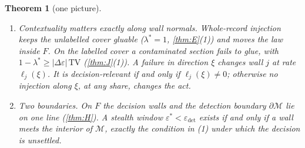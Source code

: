 \documentclass[11pt]{article}
\newtheorem{theorem}{Theorem}\renewcommand{\thetheorem}{\Alph{theorem}}
\theoremstyle{definition}\newtheorem{definition}{Definition}\newtheorem{remark}{Remark}
\begin{document}
\begin{theorem}[one picture]
\begin{enumerate}
\begin{itemize}
    $B\sigma_\ell/\sqrt N$, with $B=(c_s-q_\beta)\sqrt{\pi/(1-\pi)}$. Its capacity is measured in standard errors (\cref{thm:J}).
  \end{itemize}
\item[(4)] \emph{Contextuality matters exactly along wall normals.} Whole-record injection keeps the unlabelled cover gluable
  ($\lambda^*=1$, \cref{thm:E}(1)) and moves the law inside $F$. On the labelled cover a contaminated section fails to glue, with
  $1-\lambda^*\ge|\Delta\varepsilon|\,\mathrm{TV}$ (\cref{thm:J}(1)). A failure in direction $\xi$ changes wall $j$ at rate
  $\ell_j(\xi)$. It is \emph{decision-relevant if and only if} $\ell_j(\xi)\ne0$; otherwise no injection along $\xi$, at any share,
  changes the act.
\item[(5)] \emph{Two boundaries.} On $F$ the decision walls and the detection boundary $\partial\mathcal M$ lie on one line (\cref{thm:H}). A
  stealth window $\varepsilon^*<\varepsilon_{\det}$ exists if and only if a wall meets the interior of $\mathcal M$, exactly the
  condition in (1) under which the decision is unsettled.
\end{enumerate}
\end{theorem}
\end{document}
